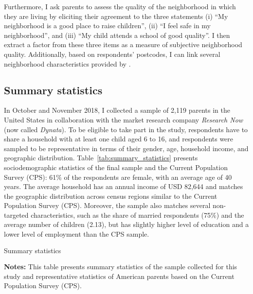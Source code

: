 \documentclass[12pt, a4paper, english]{article}
\begin{document}
Furthermore, I ask parents to assess the quality of the neighborhood in which they are living by eliciting their agreement to the three statements (i) ``My neighborhood is a good place to raise children'', (ii) ``I feel safe in my neighborhood'', and (iii) ``My child attends a school of good quality''. I then extract a factor from these three items as a measure of subjective neighborhood quality. Additionally, based on respondents' postcodes, I can link several neighborhood characteristics provided by \citet{ChettyHendren2018Exposure,ChettyHendren2018County}.

\subsection{Summary statistics}\label{sec:summarystatistics}
In October and November 2018, I collected a sample of 2,119 parents in the United States in collaboration with the market research company \textit{Research Now} (now called \textit{Dynata}). To be eligible to take part in the study, respondents have to share a household with at least one child aged 6 to 16, and respondents were sampled to be representative in terms of their gender, age, household income, and geographic distribution. Table~\ref{tab:summary_statistics} presents sociodemographic statistics of the final sample and the Current Population Survey (CPS): 61\% of the respondents are female, with an average age of 40 years. The average household has an annual income of USD 82,644 and matches the geographic distribution across census regions similar to the Current Population Survey (CPS). Moreover, the sample also matches several non-targeted characteristics, such as the share of married respondents (75\%) and the average number of children (2.13), but has slightly higher level of education and a lower level of employment than the CPS sample.

\begin{table}[h!]
    \caption{Summary statistics}\label{tab:summary_statistics}
    \centering\small
        
    \vspace{0.5em}
    \caption*{\footnotesize \textbf{Notes:} This table presents summary statistics of the sample collected for this study and representative statistics of American parents based on the Current Population Survey (CPS).}
\end{table}
\end{document}
